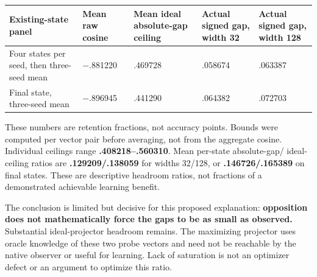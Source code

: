 \documentclass[
  british,
  10pt,
  a4paper,
]{article}
\newcounter{none} %
\begin{document}
{\def\LTcaptype{none} %
\begin{longtable}[]{@{}
  >{\raggedright\arraybackslash}p{}
  >{\raggedleft\arraybackslash}p{}
  >{\raggedleft\arraybackslash}p{}
  >{\raggedleft\arraybackslash}p{}
  >{\raggedleft\arraybackslash}p{}@{}}
\toprule\noalign{}
\begin{minipage}[b]{\linewidth}\raggedright
Existing-\allowbreak{}state panel
\end{minipage} & \begin{minipage}[b]{\linewidth}\raggedleft
Mean raw cosine
\end{minipage} & \begin{minipage}[b]{\linewidth}\raggedleft
Mean ideal absolute-\allowbreak{}gap ceiling
\end{minipage} & \begin{minipage}[b]{\linewidth}\raggedleft
Actual signed gap, width 32
\end{minipage} & \begin{minipage}[b]{\linewidth}\raggedleft
Actual signed gap, width 128
\end{minipage} \\
\midrule\noalign{}
\endhead
\bottomrule\noalign{}
\endlastfoot
Four states per seed, then three-seed mean & −.881220 & .469728 &
.058674 & .063387 \\
Final state, three-seed mean & −.896945 & .441290 & .064382 & .072703 \\
\end{longtable}
}

These numbers are retention fractions, not accuracy points. Bounds were
computed per vector pair before averaging, not from the aggregate
cosine. Individual ceilings range
\textbf{.\allowbreak{}408218–.\allowbreak{}560310}. Mean per-state
absolute-\allowbreak{}gap/\allowbreak{} ideal-\allowbreak{}ceiling
ratios are
\textbf{.\allowbreak{}129209/\allowbreak{}.\allowbreak{}138059} for
widths 32/128, or
\textbf{.\allowbreak{}146726/\allowbreak{}.\allowbreak{}165389} on final
states. These are descriptive headroom ratios, not fractions of a
demonstrated achievable learning benefit.

The conclusion is limited but decisive for this proposed explanation:
\textbf{opposition does not mathematically force the gaps to be as small
as observed.} Substantial ideal-\allowbreak{}projector headroom remains.
The maximizing projector uses oracle knowledge of these two probe
vectors and need not be reachable by the native observer or useful for
learning. Lack of saturation is not an optimizer defect or an argument
to optimize this ratio.
\end{document}
